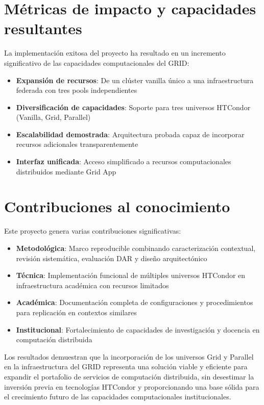 \section{Métricas de impacto y capacidades resultantes}
\noindent

La implementación exitosa del proyecto ha resultado en un incremento significativo de las capacidades computacionales del GRID:

\begin{itemize}
    \item \textbf{Expansión de recursos}: De un clúster vanilla único a una infraestructura federada con tres pools independientes
    \item \textbf{Diversificación de capacidades}: Soporte para tres universos HTCondor (Vanilla, Grid, Parallel)
    \item \textbf{Escalabilidad demostrada}: Arquitectura probada capaz de incorporar recursos adicionales transparentemente
    \item \textbf{Interfaz unificada}: Acceso simplificado a recursos computacionales distribuidos mediante Grid App
\end{itemize}

\section{Contribuciones al conocimiento}
\noindent

Este proyecto genera varias contribuciones significativas:

\begin{itemize}
    \item \textbf{Metodológica}: Marco reproducible combinando caracterización contextual, revisión sistemática, evaluación DAR y diseño arquitectónico
    \item \textbf{Técnica}: Implementación funcional de múltiples universos HTCondor en infraestructura académica con recursos limitados
    \item \textbf{Académica}: Documentación completa de configuraciones y procedimientos para replicación en contextos similares
    \item \textbf{Institucional}: Fortalecimiento de capacidades de investigación y docencia en computación distribuida
\end{itemize}

Los resultados demuestran que la incorporación de los universos Grid y Parallel en la infraestructura del GRID representa una solución viable y eficiente para expandir el portafolio de servicios de computación distribuida, sin desestimar la inversión previa en tecnologías HTCondor y proporcionando una base sólida para el crecimiento futuro de las capacidades computacionales institucionales.
